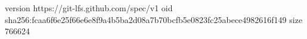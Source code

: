 version https://git-lfs.github.com/spec/v1
oid sha256:fcaa6f6e25f66e6e8f9a4b5ba2d08a7b70bcfb5e0823fc25abece4982616f149
size 766624
